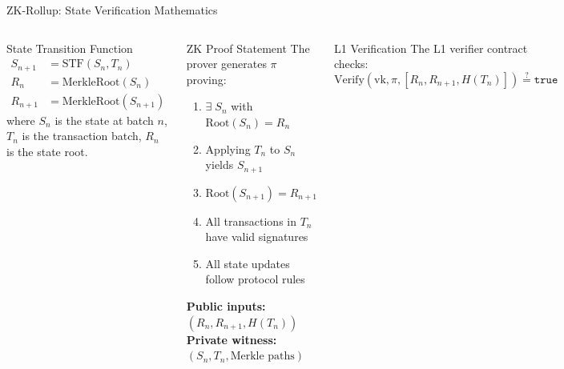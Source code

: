 \documentclass[8pt,aspectratio=169]{beamer}
\begin{document}
\begin{frame}{ZK-Rollup: State Verification Mathematics}
\begin{columns}[T]
\begin{block}{\footnotesize State Transition Function}
\footnotesize
\vspace{-0.2cm}
\begin{align*}
S_{n+1} &= \text{STF}(S_n, T_n) \\
R_n &= \text{MerkleRoot}(S_n) \\
R_{n+1} &= \text{MerkleRoot}(S_{n+1})
\end{align*}
where $S_n$ is the state at batch $n$, $T_n$ is the transaction batch, $R_n$ is the state root.
\end{block}
\vspace{0.1cm}
\begin{block}{\footnotesize ZK Proof Statement}
\footnotesize
The prover generates $\pi$ proving:
\begin{enumerate}
\item $\exists\; S_n$ with $\text{Root}(S_n) = R_n$
\item Applying $T_n$ to $S_n$ yields $S_{n+1}$
\item $\text{Root}(S_{n+1}) = R_{n+1}$
\item All transactions in $T_n$ have valid signatures
\item All state updates follow protocol rules
\end{enumerate}
\textbf{Public inputs:} $(R_n, R_{n+1}, H(T_n))$\\
\textbf{Private witness:} $(S_n, T_n, \text{Merkle paths})$
\end{block}
\begin{block}{\footnotesize L1 Verification}
\footnotesize
The L1 verifier contract checks:
$$\text{Verify}(\text{vk}, \pi, [R_n, R_{n+1}, H(T_n)]) \stackrel{?}{=} \texttt{true}$$
\end{block}
\vspace{0.1cm}
\begin{center}
\end{center}
\end{columns}
\end{frame}
\end{document}
